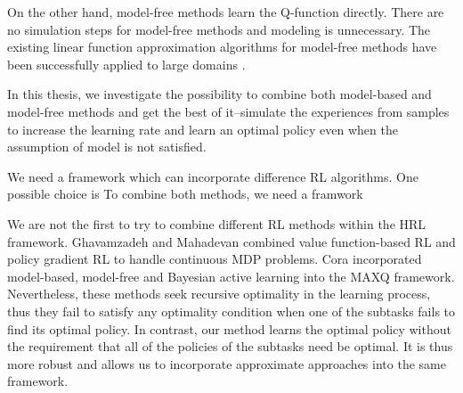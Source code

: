On the other hand, model-free methods learn the Q-function directly. 
There are no simulation steps for model-free methods and modeling is unnecessary. 
The existing linear function approximation algorithms for model-free methods have been successfully 
applied to large domains \cite{LSTD99}\cite{KeepAway}. 



In this thesis, we investigate the possibility to combine both model-based and model-free methods 
and get the best of it--simulate the experiences from samples to increase the learning rate
and learn an optimal policy even when the assumption of model is not satisfied. 

We need a framework which can incorporate difference RL algorithms.
One possible choice is 
To combine both methods, we need a framwork 




We are not the first to try to combine different RL methods within the HRL framework.  
Ghavamzadeh and Mahadevan \cite{HybridPolicy} combined value function-based RL and policy gradient RL to handle
continuous MDP problems. Cora \cite{Vlad} incorporated model-based, model-free and Bayesian active learning into the MAXQ framework.
Nevertheless, these methods seek recursive optimality in the learning process, 
thus they fail to satisfy any optimality condition when one of the subtasks
fails to find its optimal policy.
In contrast, our method learns the optimal policy without the requirement that 
all of the policies of the subtasks need be optimal. It is thus more robust and allows us to incorporate approximate
approaches into the same framework.

